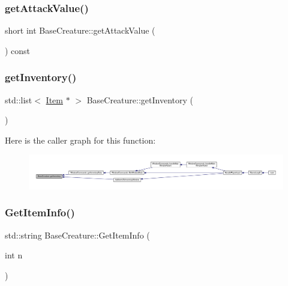 \subsubsection{\texorpdfstring{get\+Attack\+Value()}{getAttackValue()}}
{\footnotesize\ttfamily short int Base\+Creature\+::get\+Attack\+Value (\begin{DoxyParamCaption}{ }\end{DoxyParamCaption}) const}

\mbox{\label{class_base_creature_a505e70415a3e2db87aac0767498375ff}} 
\subsubsection{\texorpdfstring{get\+Inventory()}{getInventory()}}
{\footnotesize\ttfamily std\+::list$<$ \mbox{\hyperlink{class_item}{Item}} $\ast$ $>$ Base\+Creature\+::get\+Inventory (\begin{DoxyParamCaption}{ }\end{DoxyParamCaption})}

Here is the caller graph for this function\+:
\nopagebreak
\begin{figure}[H]
\begin{center}
\leavevmode
\includegraphics[width=350pt]{d2/d3b/class_base_creature_a505e70415a3e2db87aac0767498375ff_icgraph}
\end{center}
\end{figure}
\mbox{\label{class_base_creature_a19f380cccb11f31d10d00de934da1b7f}} 
\subsubsection{\texorpdfstring{Get\+Item\+Info()}{GetItemInfo()}}
{\footnotesize\ttfamily std\+::string Base\+Creature\+::\+Get\+Item\+Info (\begin{DoxyParamCaption}\item[{int}]{n }\end{DoxyParamCaption})}


